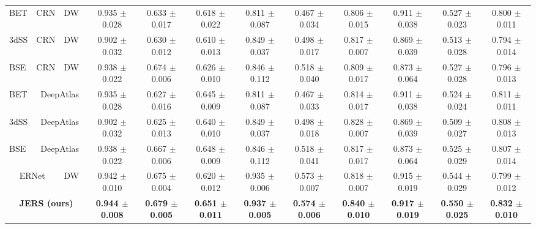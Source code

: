 \begin{table*}[t]
{\begin{tabular}{lccccccccccc}
    BET \cite{smith2002fast} & CRN \cite{zhao2019recursive} & DW~\cite{jaderberg2015spatial} & 0.935  $\pm$ 0.028 &
0.633 $\pm$ 0.017 &
0.618 $\pm$ 0.022  & 0.811  $\pm$ 0.087 &
0.467 $\pm$ 0.034 &
0.806 $\pm$ 0.015 &
 0.911  $\pm$ 0.038 &
0.527 $\pm$ 0.023 &
0.800 $\pm$ 0.011\\

    3dSS \cite{cox1996afni} & CRN \cite{zhao2019recursive} & DW~\cite{jaderberg2015spatial} & 0.902  $\pm$ 0.032 &
0.630 $\pm$ 0.012 &
0.610 $\pm$ 0.013  & 0.849  $\pm$ 0.037 &
0.498 $\pm$ 0.017 &
0.817 $\pm$ 0.007 &
 0.869  $\pm$ 0.039 &
0.513 $\pm$ 0.028 &
0.794 $\pm$ 0.014\\

    BSE \cite{shattuck2002brainsuite} & CRN \cite{zhao2019recursive} &DW~\cite{jaderberg2015spatial} & 0.938  $\pm$ 0.022 &
0.674 $\pm$ 0.006 &
0.626 $\pm$ 0.010  & 0.846  $\pm$ 0.112 &
0.518 $\pm$ 0.040 &
0.809 $\pm$ 0.017 &
 0.873  $\pm$ 0.064 &
0.527 $\pm$ 0.028 &
0.796 $\pm$ 0.013\\
    \midrule

        BET \cite{smith2002fast} & \multicolumn{2}{c}{DeepAtlas \cite{xu2019deepatlas}} & 0.935  $\pm$ 0.028 & 0.627 $\pm$ 0.016 & 0.645 $\pm$ 0.009  & 0.811  $\pm$ 0.087 &
0.467 $\pm$ 0.033 &
0.814 $\pm$ 0.017 &
 0.911  $\pm$ 0.038 &
0.524 $\pm$ 0.024 &
0.811 $\pm$ 0.011 \\

    3dSS \cite{cox1996afni} & \multicolumn{2}{c}{DeepAtlas \cite{xu2019deepatlas}} & 0.902  $\pm$ 0.032 & 0.625 $\pm$ 0.013 & 0.640 $\pm$ 0.010  & 0.849  $\pm$ 0.037 &
0.498 $\pm$ 0.018 &
0.828 $\pm$ 0.007 &
 0.869  $\pm$ 0.039 &
0.509 $\pm$ 0.027 &
0.808 $\pm$ 0.013\\

    BSE \cite{shattuck2002brainsuite} & \multicolumn{2}{c}{DeepAtlas \cite{xu2019deepatlas}} & 0.938  $\pm$ 0.022 &
0.667 $\pm$ 0.006 &
0.648 $\pm$ 0.009  & 0.846  $\pm$ 0.112 &
0.518 $\pm$ 0.041 &
0.817 $\pm$ 0.017 &
 0.873  $\pm$ 0.064 &
0.525 $\pm$ 0.029 &
0.807 $\pm$ 0.014\\
    \midrule

    \multicolumn{2}{c}{ERNet \cite{su2022ernet}} & DW~\cite{jaderberg2015spatial} & 0.942 $\pm$ 0.010 &
0.675 $\pm$ 0.004 &
0.620 $\pm$ 0.012  & 0.935 $\pm$ 0.006 &
0.573 $\pm$ 0.007 &
0.818 $\pm$ 0.007 &
 0.915 $\pm$ 0.019 &
0.544 $\pm$ 0.029 &
0.799 $\pm$ 0.012\\
    \midrule
    \multicolumn{3}{c}{\textbf{JERS (ours)}} &
   \textbf{ 0.944 $\pm$ 0.008} &
\textbf{0.679 $\pm$ 0.005} &
\textbf{0.651 $\pm$ 0.011}  & \textbf{0.937 $\pm$ 0.005} &
\textbf{0.574 $\pm$ 0.006} &
\textbf{0.840 $\pm$ 0.010} &
 \textbf{0.917 $\pm$ 0.019} &
\textbf{0.550 $\pm$ 0.025} &
\textbf{0.832 $\pm$ 0.010}
\\
    
    \bottomrule    
    \end{tabular}}
    \vspace{-10pt}
\end{table*}

